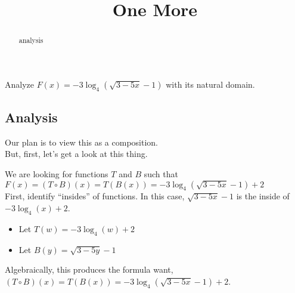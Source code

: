 \documentclass{ximera}
\title{One More}
\begin{document}
\begin{abstract}
analysis
\end{abstract}
\maketitle












Analyze $F(x) = -3 \log_4(\sqrt{3 - 5x} - 1)$ with its natural domain. \\




\subsection*{Analysis}





Our plan is to view this as a composition. \\



But, first, let's get a look at this thing. \\



\begin{center}
\end{center}









We are looking for functions $T$ and $B$ such that $F(x) = (T \circ B)(x) = T(B(x)) = -3 \log_4(\sqrt{3 - 5x} - 1) + 2$ \\


First, identify ``insides'' of functions.  In this case, $\sqrt{3 - 5x} - 1$ is the inside of $-3 \log_4(x) + 2$. \\



\begin{itemize}
\item Let $T(w) = -3 \log_4(w) + 2$ \\
\item Let $B(y) = \sqrt{3 - 5y} - 1$ \\
\end{itemize}

Algebraically, this produces the formula want,  $(T \circ B)(x) = T(B(x)) = -3 \log_4(\sqrt{3 - 5x} - 1) + 2$.
\end{document}
